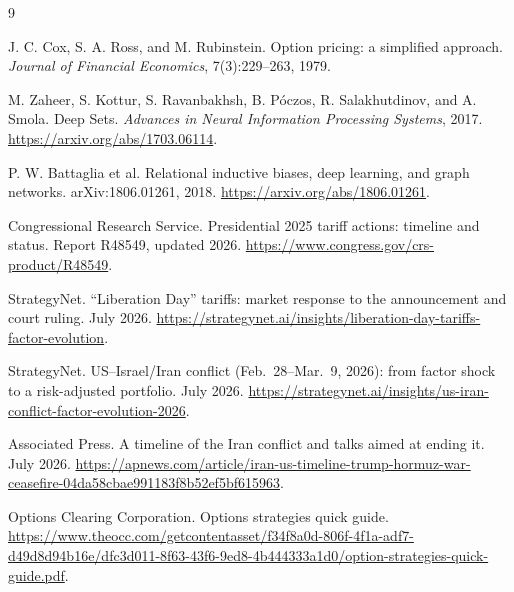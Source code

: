\documentclass{strategynet-journal}
\begin{document}
\begin{thebibliography}{9}

J. C. Cox, S. A. Ross, and M. Rubinstein.
\newblock Option pricing: a simplified approach.
\newblock \emph{Journal of Financial Economics}, 7(3):229--263, 1979.

M. Zaheer, S. Kottur, S. Ravanbakhsh, B. P\'oczos, R. Salakhutdinov,
and A. Smola.
\newblock Deep Sets.
\newblock \emph{Advances in Neural Information Processing Systems}, 2017.
\newblock \url{https://arxiv.org/abs/1703.06114}.

P. W. Battaglia et al.
\newblock Relational inductive biases, deep learning, and graph networks.
\newblock arXiv:1806.01261, 2018.
\newblock \url{https://arxiv.org/abs/1806.01261}.

Congressional Research Service.
\newblock Presidential 2025 tariff actions: timeline and status.
\newblock Report R48549, updated 2026.
\newblock \url{https://www.congress.gov/crs-product/R48549}.

StrategyNet.
\newblock ``Liberation Day'' tariffs: market response to the announcement
and court ruling.
 July 2026.
\newblock
\url{https://strategynet.ai/insights/liberation-day-tariffs-factor-evolution}.

StrategyNet.
\newblock US--Israel/Iran conflict (Feb.\ 28--Mar.\ 9, 2026): from factor
shock to a risk-adjusted portfolio.
 July 2026.
\newblock
\url{https://strategynet.ai/insights/us-iran-conflict-factor-evolution-2026}.

Associated Press.
\newblock A timeline of the Iran conflict and talks aimed at ending it.
\newblock July 2026.
\newblock
\url{https://apnews.com/article/iran-us-timeline-trump-hormuz-war-ceasefire-04da58cbae991183f8b52ef5bf615963}.

Options Clearing Corporation.
\newblock Options strategies quick guide.
\newblock
\url{https://www.theocc.com/getcontentasset/f34f8a0d-806f-4f1a-adf7-d49d8d94b16e/dfc3d011-8f63-43f6-9ed8-4b444333a1d0/option-strategies-quick-guide.pdf}.

\end{thebibliography}
\end{document}
